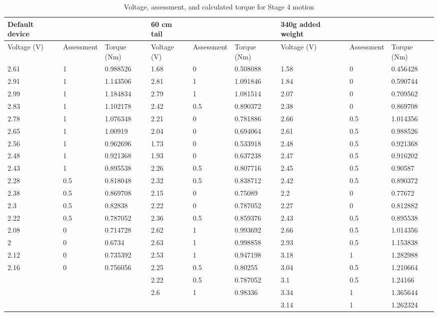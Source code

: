 \begin{landscape}
\begin{table}[!ht]
	\centering
	\caption{Voltage, assessment, and calculated torque for Stage 4 motion}
	\footnotesize
	\begin{tabular}{|l|l|l|l|l|l|l|l|l|}
		\hline
		Default device & ~ & ~ & 60 cm tail & ~ & ~ & 340g added weight & ~ & ~ \\ \hline
		Voltage (V) & Assessment & Torque (Nm) & Voltage (V) & Assessment & Torque (Nm) & Voltage (V) & Assessment & Torque (Nm) \\ \hline
		2.61 & 1 & 0.988526 & 1.68 & 0 & 0.508088 & 1.58 & 0 & 0.456428 \\ \hline
		2.91 & 1 & 1.143506 & 2.81 & 1 & 1.091846 & 1.84 & 0 & 0.590744 \\ \hline
		2.99 & 1 & 1.184834 & 2.79 & 1 & 1.081514 & 2.07 & 0 & 0.709562 \\ \hline
		2.83 & 1 & 1.102178 & 2.42 & 0.5 & 0.890372 & 2.38 & 0 & 0.869708 \\ \hline
		2.78 & 1 & 1.076348 & 2.21 & 0 & 0.781886 & 2.66 & 0.5 & 1.014356 \\ \hline
		2.65 & 1 & 1.00919 & 2.04 & 0 & 0.694064 & 2.61 & 0.5 & 0.988526 \\ \hline
		2.56 & 1 & 0.962696 & 1.73 & 0 & 0.533918 & 2.48 & 0.5 & 0.921368 \\ \hline
		2.48 & 1 & 0.921368 & 1.93 & 0 & 0.637238 & 2.47 & 0.5 & 0.916202 \\ \hline
		2.43 & 1 & 0.895538 & 2.26 & 0.5 & 0.807716 & 2.45 & 0.5 & 0.90587 \\ \hline
		2.28 & 0.5 & 0.818048 & 2.32 & 0.5 & 0.838712 & 2.42 & 0.5 & 0.890372 \\ \hline
		2.38 & 0.5 & 0.869708 & 2.15 & 0 & 0.75089 & 2.2 & 0 & 0.77672 \\ \hline
		2.3 & 0.5 & 0.82838 & 2.22 & 0 & 0.787052 & 2.27 & 0 & 0.812882 \\ \hline
		2.22 & 0.5 & 0.787052 & 2.36 & 0.5 & 0.859376 & 2.43 & 0.5 & 0.895538 \\ \hline
		2.08 & 0 & 0.714728 & 2.62 & 1 & 0.993692 & 2.66 & 0.5 & 1.014356 \\ \hline
		2 & 0 & 0.6734 & 2.63 & 1 & 0.998858 & 2.93 & 0.5 & 1.153838 \\ \hline
		2.12 & 0 & 0.735392 & 2.53 & 1 & 0.947198 & 3.18 & 1 & 1.282988 \\ \hline
		2.16 & 0 & 0.756056 & 2.25 & 0.5 & 0.80255 & 3.04 & 0.5 & 1.210664 \\ \hline
		~ & ~ & ~ & 2.22 & 0.5 & 0.787052 & 3.1 & 0.5 & 1.24166 \\ \hline
		~ & ~ & ~ & 2.6 & 1 & 0.98336 & 3.34 & 1 & 1.365644 \\ \hline
		~ & ~ & ~ & ~ & ~ & ~ & 3.14 & 1 & 1.262324 \\ \hline
	\end{tabular}
\end{table}


\end{landscape}
